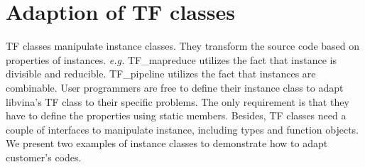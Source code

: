 \documentclass[10pt, conference, compsocconf]{IEEEtran}
\begin{document}
\section{Adaption of TF classes}
TF classes manipulate instance classes. They transform the source code based on properties
of instances. \textit{e.g.} TF\_mapreduce utilizes the fact that
instance is divisible and reducible. TF\_pipeline utilizes the fact
that instances are combinable.  
User programmers are free to define their instance class to adapt libvina's TF class to their specific
problems. The only requirement is that they have to define the
properties using static members. Besides, TF classes need a couple of
interfaces to manipulate instance, including types and function
objects. We present two examples
of instance classes to demonstrate how to adapt customer's codes.
\end{document}
